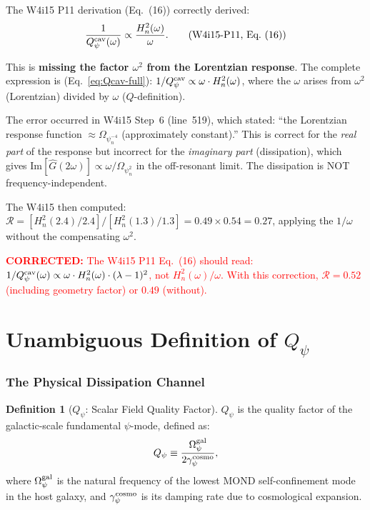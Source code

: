 \documentclass[11pt]{article}
\newcommand{\Heff}{H_n}
\newcommand{\Opsi}{\Omega_\psi}
\newcommand{\corrected}[1]{\textcolor{red}{\textbf{CORRECTED:} #1}}
\theoremstyle{definition}
\newtheorem{definition}[theorem]{Definition}
\theoremstyle{remark}
\begin{document}
The W4i15 P11 derivation (Eq.~(16)) correctly derived:
\begin{equation}
\frac{1}{Q_\psi^{\rm cav}(\omega)} \propto
\frac{\Heff^2(\omega)}{\omega}.
\tag{W4i15-P11, Eq.~(16)}
\end{equation}

This is \textbf{missing the factor $\omega^2$ from the Lorentzian
response}. The complete expression is (Eq.~\eqref{eq:Qcav-full}):
$1/Q_\psi^{\rm cav} \propto \omega \cdot \Heff^2(\omega)$, where
the $\omega$ arises from $\omega^2$ (Lorentzian) divided by $\omega$
($Q$-definition).

The error occurred in W4i15 Step~6 (line~519), which stated:
``the Lorentzian response function $\approx \Opsi_n^{-4}$
(approximately constant).'' This is correct for the \emph{real part}
of the response but incorrect for the \emph{imaginary part}
(dissipation), which gives Im$[\hat{G}(2\omega)] \propto
\omega/\Opsi_n^2$ in the off-resonant limit. The dissipation is
NOT frequency-independent.

The W4i15 then computed:
$\mathcal{R} = [\Heff^2(2.4)/2.4]/[\Heff^2(1.3)/1.3]
= 0.49 \times 0.54 = 0.27$, applying the $1/\omega$ without the
compensating $\omega^2$.

\corrected{The W4i15 P11 Eq.~(16) should read:
$1/Q_\psi^{\rm cav}(\omega) \propto \omega \cdot \Heff^2(\omega)
\cdot (\lambda-1)^2$, not $\Heff^2(\omega)/\omega$. With this
correction, $\mathcal{R} = 0.52$ (including geometry factor) or
$0.49$ (without).}


\part{Unambiguous Definition of $Q_\psi$}
\label{part:Qpsi}


\section{The Physical Dissipation Channel}
\label{sec:dissipation}

\begin{definition}[$Q_\psi$: Scalar Field Quality Factor]
\label{def:Qpsi}
$Q_\psi$ is the quality factor of the galactic-scale fundamental
$\psi$-mode, defined as:
\begin{equation}
Q_\psi \equiv \frac{\Opsi^{\rm gal}}{2\gamma_\psi^{\rm cosmo}},
\end{equation}
where $\Opsi^{\rm gal}$ is the natural frequency of the lowest
MOND self-confinement mode in the host galaxy, and
$\gamma_\psi^{\rm cosmo}$ is its damping rate due to cosmological
expansion.
\end{definition}
\end{document}
